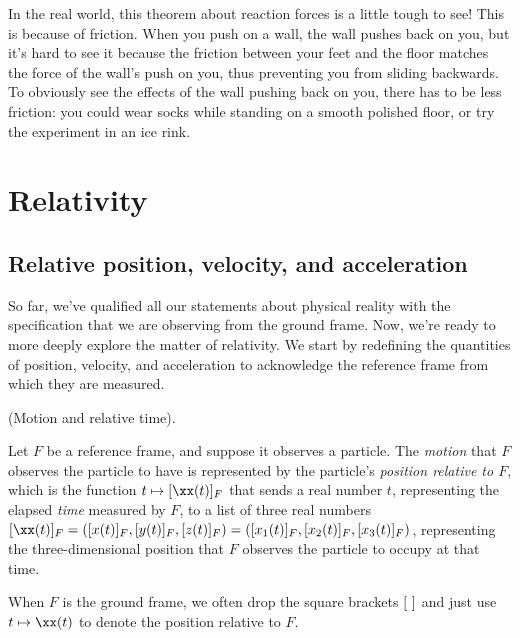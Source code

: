 \documentclass{article}
\begin{document}
In the real world, this theorem about reaction forces is a little tough to see! This is because of friction. When you push on a wall, the wall pushes back on you, but it's hard to see it because the friction between your feet and the floor matches the force of the wall's push on you, thus preventing you from sliding backwards. To obviously see the effects of the wall pushing back on you, there has to be less friction: you could wear socks while standing on a smooth polished floor, or try the experiment in an ice rink.

\newpage

\section*{Relativity}

\subsection*{Relative position, velocity, and acceleration}

So far, we've qualified all our statements about physical reality with the specification that we are observing from the ground frame. Now, we're ready to more deeply explore the matter of relativity. We start by redefining the quantities of position, velocity, and acceleration to acknowledge the reference frame from which they are measured.

\begin{defn}
	(Motion and relative time).
	
	Let $F$ be a reference frame, and suppose it observes a particle. The \textit{motion} that $F$ observes the particle to have is represented by the particle's \textit{position relative to $F$}, which is the function $t \mapsto [\xx(t)]_F$ that sends a real number $t$, representing the elapsed \textit{time} measured by $F$, to a list of three real numbers $[\xx(t)]_F = ([x(t)]_F, [y(t)]_F, [z(t)]_F) = ([x_1(t)]_F, [x_2(t)]_F, [x_3(t)]_F)$, representing the three-dimensional position that $F$ observes the particle to occupy at that time.
	
	When $F$ is the ground frame, we often drop the square brackets $[\text{ }]$ and just use $t \mapsto \xx(t)$ to denote the position relative to $F$.
\end{defn}
\end{document}
